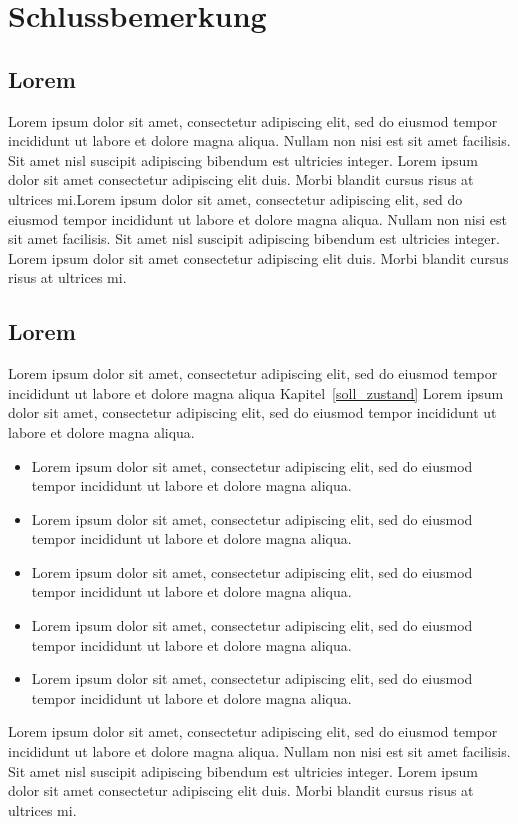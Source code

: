 \fancyhead[L]{\nouppercase{}} 
\section{Schlussbemerkung}\label{schlussbemerkung}
\subsection{Lorem}
Lorem ipsum dolor sit amet, consectetur adipiscing elit, sed do eiusmod tempor incididunt ut labore et dolore magna aliqua. Nullam non nisi est sit amet facilisis. Sit amet nisl suscipit adipiscing bibendum est ultricies integer. Lorem ipsum dolor sit amet consectetur adipiscing elit duis. Morbi blandit cursus risus at ultrices mi.Lorem ipsum dolor sit amet, consectetur adipiscing elit, sed do eiusmod tempor incididunt ut labore et dolore magna aliqua. Nullam non nisi est sit amet facilisis. Sit amet nisl suscipit adipiscing bibendum est ultricies integer. Lorem ipsum dolor sit amet consectetur adipiscing elit duis. Morbi blandit cursus risus at ultrices mi.
\subsection{Lorem}
Lorem ipsum dolor sit amet, consectetur adipiscing elit, sed do eiusmod tempor incididunt ut labore et dolore magna aliqua Kapitel~\ref{soll_zustand} Lorem ipsum dolor sit amet, consectetur adipiscing elit, sed do eiusmod tempor incididunt ut labore et dolore magna aliqua.
\begin{itemize}
\item Lorem ipsum dolor sit amet, consectetur adipiscing elit, sed do eiusmod tempor incididunt ut labore et dolore magna aliqua.
\item Lorem ipsum dolor sit amet, consectetur adipiscing elit, sed do eiusmod tempor incididunt ut labore et dolore magna aliqua.
\item Lorem ipsum dolor sit amet, consectetur adipiscing elit, sed do eiusmod tempor incididunt ut labore et dolore magna aliqua.
\item Lorem ipsum dolor sit amet, consectetur adipiscing elit, sed do eiusmod tempor incididunt ut labore et dolore magna aliqua.
\item Lorem ipsum dolor sit amet, consectetur adipiscing elit, sed do eiusmod tempor incididunt ut labore et dolore magna aliqua.
\end{itemize}
Lorem ipsum dolor sit amet, consectetur adipiscing elit, sed do eiusmod tempor incididunt ut labore et dolore magna aliqua. Nullam non nisi est sit amet facilisis. Sit amet nisl suscipit adipiscing bibendum est ultricies integer. Lorem ipsum dolor sit amet consectetur adipiscing elit duis. Morbi blandit cursus risus at ultrices mi.
\newpage
\fancyhead[L]{\nouppercase{\leftmark}} 
\noindent

